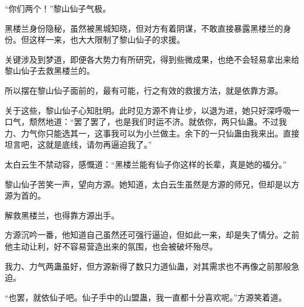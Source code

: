 \begin{this_body}
“你们两个！”黎山仙子气极。

黑楼兰身份隐秘，虽然被黑城知晓，但对方有着阴谋，不敢直接暴露黑楼兰的身份。但这样一来，也大大限制了黎山仙子的求援。

关键涉及到梦道，即便各大势力有所研究，得到些微成果，也绝不会轻易拿出来给黎山仙子去救黑楼兰的。

所以摆在黎山仙子面前的，最有可能，行之有效的救援方法，就是依靠方源。

关于这些，黎山仙子心知肚明。此时见方源不肯让步，以退为进，她只好深呼吸一口气，颓然地道：“罢了罢了，也是我们时运不济。就依你，两只仙蛊。不过我力、力气你只能选其一，这事我可以为小兰做主。余下的一只仙蛊由我来出。直接坦言吧，这就是底线，请勿再逼迫我了。”

太白云生不禁动容，感慨道：“黑楼兰能有仙子你这样的长辈，真是她的福分。”

黎山仙子苦笑一声，望向方源。她知道，太白云生虽然是方源的师兄，但却是以方源为首的。

解救黑楼兰，也得靠方源出手。

方源沉吟一番，他知道自己虽然还可强行逼迫，但如此一来，却是失了情分。之前他主动让利，好不容易营造出来的氛围，也会被破坏殆尽。

我力、力气两蛊虽好，但方源新得了数只力道仙蛊，对其需求也不再像之前那般急迫。

“也罢，就依仙子吧。仙子手中的山盟蛊，我一直都十分喜欢呢。”方源笑着道。

\end{this_body}

